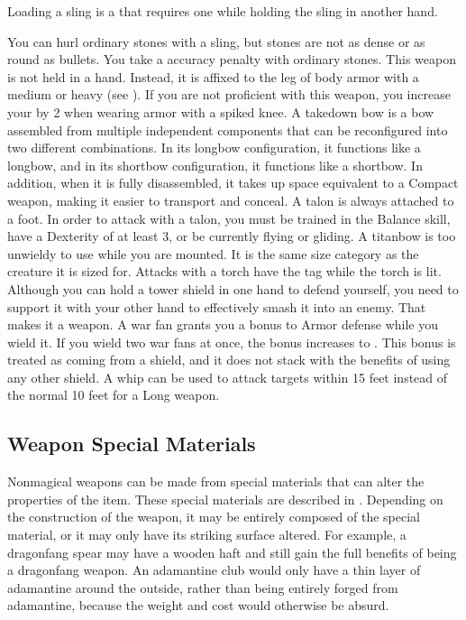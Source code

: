      Loading a sling is a  that requires one  while holding the sling in another hand.
    \par You can hurl ordinary stones with a sling, but stones are not as dense or as round as bullets. You take a  accuracy penalty with ordinary stones.
     This weapon is not held in a hand.
    Instead, it is affixed to the leg of body armor with a medium or heavy  (see ).
    If you are not proficient with this weapon, you increase your  by 2 when wearing armor with a spiked knee.
     A takedown bow is a bow assembled from multiple independent components that can be reconfigured into two different combinations.
    In its longbow configuration, it functions like a longbow, and in its shortbow configuration, it functions like a shortbow.
    In addition, when it is fully disassembled, it takes up space equivalent to a Compact weapon, making it easier to transport and conceal.
     A talon is always attached to a foot.
    In order to attack with a talon, you must be trained in the Balance skill, have a Dexterity of at least 3, or be currently flying or gliding.
     A titanbow is too unwieldy to use while you are mounted.
    It is the same size category as the creature it is sized for.
     Attacks with a torch have the \atFire tag while the torch is lit.
     Although you can hold a tower shield in one hand to defend yourself, you need to support it with your other hand to effectively smash it into an enemy.
    That makes it a  weapon.
     A war fan grants you a  bonus to Armor defense while you wield it.
    If you wield two war fans at once, the bonus increases to .
    This bonus is treated as coming from a shield, and it does not stack with the benefits of using any other shield.
     A whip can be used to attack targets within 15 feet instead of the normal 10 feet for a Long weapon.

  \subsection{Weapon Special Materials}\label{Weapon Special Materials}
    Nonmagical weapons can be made from special materials that can alter the properties of the item.
    These special materials are described in .
    Depending on the construction of the weapon, it may be entirely composed of the special material, or it may only have its striking surface altered.
    For example, a dragonfang spear may have a wooden haft and still gain the full benefits of being a dragonfang weapon.
    An adamantine club would only have a thin layer of adamantine around the outside, rather than being entirely forged from adamantine, because the weight and cost would otherwise be absurd.

